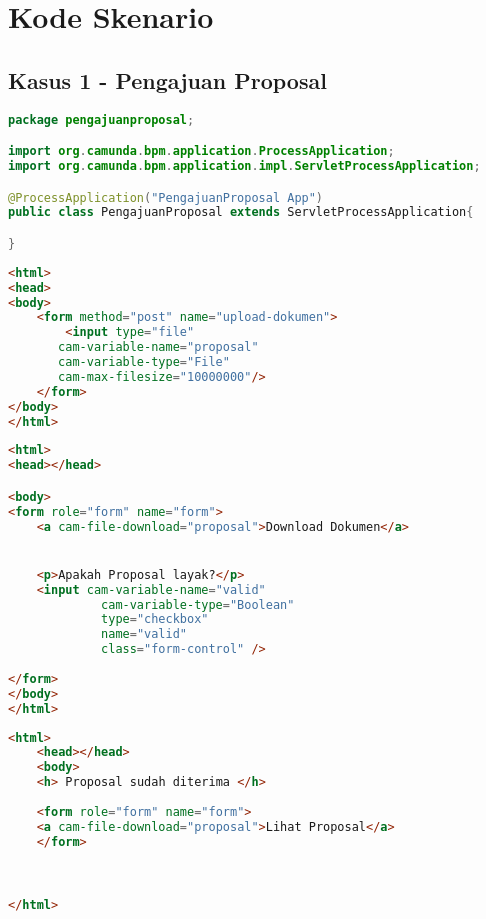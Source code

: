\chapter{Kode Skenario}
\label{lamp:kodeskenario}

\section{Kasus 1 - Pengajuan Proposal}
\label{sec:kodekasus1}
\begin{lstlisting}[language=Java,basicstyle=\tiny,caption=PengajuanProposal.java]
package pengajuanproposal;

import org.camunda.bpm.application.ProcessApplication;
import org.camunda.bpm.application.impl.ServletProcessApplication;

@ProcessApplication("PengajuanProposal App")
public class PengajuanProposal extends ServletProcessApplication{

}
\end{lstlisting}

\begin{lstlisting}[language=html,basicstyle=\tiny,caption=MengunggahProposal.html]
<html>
<head>
<body>
	<form method="post" name="upload-dokumen">
		<input type="file"
       cam-variable-name="proposal"
       cam-variable-type="File"
       cam-max-filesize="10000000"/>
	</form>
</body>
</html>
\end{lstlisting}

\begin{lstlisting}[language=html,basicstyle=\tiny,caption=MemeriksaProposal.html]
<html>
<head></head>

<body>
<form role="form" name="form">
  	<a cam-file-download="proposal">Download Dokumen</a>


    <p>Apakah Proposal layak?</p>
    <input cam-variable-name="valid"
             cam-variable-type="Boolean"
             type="checkbox"
             name="valid"
             class="form-control" />
    
</form> 
</body>
</html>
\end{lstlisting}


\begin{lstlisting}[language=html,basicstyle=\tiny,caption=MelihatStatusProposal.html]
<html>
	<head></head>
	<body>
	<h> Proposal sudah diterima </h>
	
	<form role="form" name="form">
  	<a cam-file-download="proposal">Lihat Proposal</a>
  	</form>
	


</html>
\end{lstlisting}



